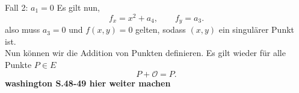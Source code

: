 Fall 2: $a_1=0$
Es gilt nun,
\[
    f_x=x^2+a_4,\qquad f_y=a_3.
\]
also muss \(a_3= 0\) und $f(x,y)=0$ gelten, sodass $(x,y)$ ein singulärer Punkt ist.\\

Nun können wir die Addition von Punkten definieren. Es gilt wieder für alle Punkte $P\in E$
\[
    P+\mathcal{O}=P.
\]
\textbf{washington S.48-49 hier weiter machen}

